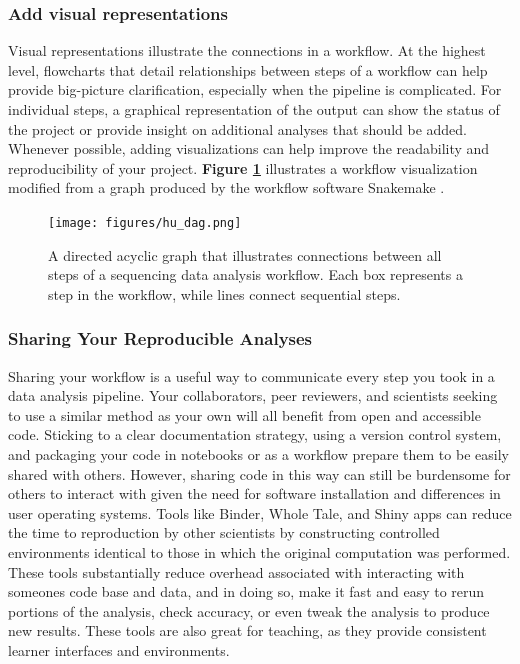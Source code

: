 \documentclass[10pt,letterpaper]{article}
\begin{document}
\subsubsection*{Add visual representations} 
Visual representations illustrate the connections in a workflow. 
At the highest level, flowcharts that detail relationships between steps of a workflow can help provide big-picture clarification, especially when the pipeline is complicated. 
For individual steps, a graphical representation of the output can show the status of the project or provide insight on additional analyses that should be added. 
Whenever possible, adding visualizations can help improve the readability and reproducibility of your project. \textbf{Figure \ref{fig:sgc_workflow}} illustrates a workflow visualization modified from a graph produced by the workflow software Snakemake \cite{brown2019exploring}. 

\begin{figure}
\texttt{[image: figures/hu\_dag.png]}
\caption{A directed acyclic graph that illustrates connections between all steps of a sequencing data analysis workflow. Each box represents a step in the workflow, while lines connect sequential steps.}
\label{fig:sgc_workflow}
\end{figure}

\subsubsection*{Sharing Your Reproducible Analyses} 
Sharing your workflow is a useful way to communicate every step you took in a data analysis pipeline. 
Your collaborators, peer reviewers, and scientists seeking to use a similar method as your own will all benefit from open and accessible code. 
Sticking to a clear documentation strategy, using a version control system, and packaging your code in notebooks or as a workflow prepare them to be easily shared with others. 
However, sharing code in this way can still be burdensome for others to interact with given the need for software installation and differences in user operating systems. 
Tools like Binder, Whole Tale, and Shiny apps can reduce the time to reproduction by other scientists by constructing controlled environments identical to those in which the original computation was performed. 
These tools substantially reduce overhead associated with interacting with someones code base and data, and in doing so, make it fast and easy to rerun portions of the analysis, check accuracy, or even tweak the analysis to produce new results. 
These tools are also great for teaching, as they provide consistent learner interfaces and environments. 
\end{document}
